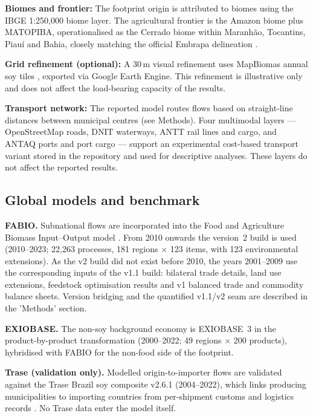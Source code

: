 \textbf{Biomes and frontier:} The footprint origin is attributed to biomes using the IBGE 1:250{,}000 biome layer. The agricultural frontier is the Amazon biome plus MATOPIBA, operationalised as the Cerrado biome within Maranh\~ao, Tocantins, Piau\'i and Bahia, closely matching the official Embrapa delineation \cite{miranda2014matopiba}.

\textbf{Grid refinement (optional):} A 30\,m visual refinement uses
MapBiomas annual soy tiles \cite{souza2020mapbiomas}, exported via Google
Earth Engine. This refinement is illustrative only and does not affect the load-bearing capacity of the results.

\textbf{Transport network:} The reported model routes flows based on straight-line distances between municipal centres (see Methods). Four multimodal layers — OpenStreetMap roads, DNIT waterways, ANTT rail lines and cargo, and ANTAQ ports and port cargo — support an experimental cost-based transport variant stored in the repository and used for descriptive analyses. These layers do not affect the reported results.

\subsection{Global models and benchmark}\label{subsec:mrio-data}

\textbf{FABIO.} Subnational flows are incorporated into the Food and Agriculture
Biomass Input--Output model \cite{bruckner2019fabio}. From 2010 onwards the
version~2 build is used (2010--2023; 22{,}263 processes, 181 regions
$\times$ 123 items, with 123 environmental extensions). As the v2 build did not exist before 2010, the years 2001–2009 use the corresponding inputs of the v1.1 build: bilateral trade details, land use extensions, feedstock optimisation results and v1 balanced trade and commodity balance sheets. Version bridging and the quantified v1.1/v2 seam are described in the 'Methods' section.

\textbf{EXIOBASE.} The non-soy background economy is EXIOBASE~3
\cite{stadler2018exiobase} in the product-by-product transformation
(2000--2022; 49 regions $\times$ 200 products), hybridised with FABIO for
the non-food side of the footprint.

\textbf{Trase (validation only).} Modelled origin-to-importer flows are
validated against the Trase Brazil soy composite v2.6.1 (2004--2022), which
links producing municipalities to importing countries from per-shipment
customs and logistics records \cite{godar2015sei,escobar2020trase}. No
Trase data enter the model itself.


